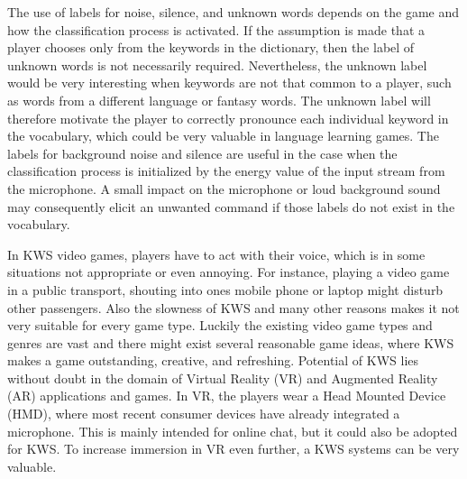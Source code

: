 The use of labels for noise, silence, and unknown words depends on the game and how the classification process is activated.
If the assumption is made that a player chooses only from the keywords in the dictionary, then the label of unknown words is not necessarily required.
Nevertheless, the unknown label would be very interesting when keywords are not that common to a player, such as words from a different language or fantasy words.
The unknown label will therefore motivate the player to correctly pronounce each individual keyword in the vocabulary, which could be very valuable in language learning games.
The labels for background noise and silence are useful in the case when the classification process is initialized by the energy value of the input stream from the microphone.
A small impact on the microphone or loud background sound may consequently elicit an unwanted command if those labels do not exist in the vocabulary.

In KWS video games, players have to act with their voice, which is in some situations not appropriate or even annoying.
For instance, playing a video game in a public transport, shouting into ones mobile phone or laptop might disturb other passengers.
Also the slowness of KWS and many other reasons makes it not very suitable for every game type.
Luckily the existing video game types and genres are vast and there might exist several reasonable game ideas, where KWS makes a game outstanding, creative, and refreshing.
Potential of KWS lies without doubt in the domain of Virtual Reality (VR) and Augmented Reality (AR) applications and games.
In VR, the players wear a Head Mounted Device (HMD), where most recent consumer devices have already integrated a microphone.
This is mainly intended for online chat, but it could also be adopted for KWS.
To increase immersion in VR even further, a KWS systems can be very valuable.